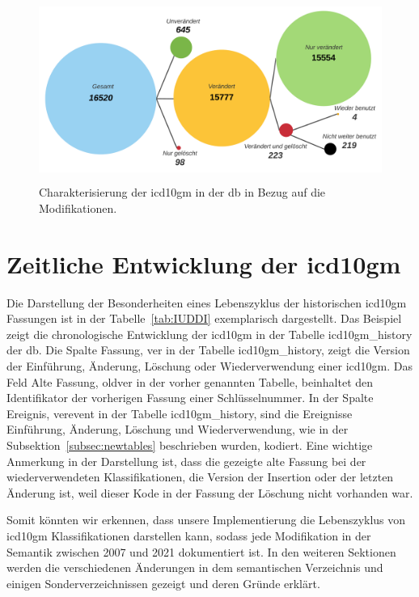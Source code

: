  \begin{figure}[ht]
 	\centering
 	\includegraphics[height=6cm]{figures/icd10gm_quantities}
 	\caption[\acs{icd10gm} in der \acs{db}]{Charakterisierung der \acs{icd10gm} in der \ac{db} in Bezug auf die Modifikationen.}
 	\label{fig:icddb}
 \end{figure}

\section{Zeitliche Entwicklung der \acs{icd10gm}} \label{sec:timeicd}

Die Darstellung der Besonderheiten eines Lebenszyklus der historischen \ac{icd10gm} Fassungen ist in der Tabelle~\ref{tab:IUDDI} exemplarisch dargestellt. Das Beispiel zeigt die chronologische Entwicklung der \ac{icd10gm} in der Tabelle \glqq\textsf{icd10gm\_history}\grqq{} der \ac{db}. Die Spalte Fassung, \glqq\textsf{ver}\grqq{} in der Tabelle \glqq\textsf{icd10gm\_history}\grqq{}, zeigt die Version der Einführung, Änderung, Löschung oder Wiederverwendung einer \ac{icd10gm}. Das Feld Alte Fassung, \glqq\textsf{oldver}\grqq{} in der vorher genannten Tabelle, beinhaltet den Identifikator der vorherigen Fassung einer Schlüsselnummer. In der Spalte Ereignis, \glqq\textsf{verevent}\grqq{} in der Tabelle \glqq\textsf{icd10gm\_history}\grqq{}, sind die Ereignisse Einführung, Änderung, Löschung und Wiederverwendung, wie in der Subsektion~\ref{subsec:newtables} beschrieben wurden, kodiert. Eine wichtige Anmerkung in der Darstellung ist, dass die gezeigte alte Fassung bei der wiederverwendeten Klassifikationen, die Version der Insertion oder der letzten Änderung ist, weil dieser Kode in der Fassung der Löschung nicht vorhanden war.

Somit könnten wir erkennen, dass unsere Implementierung die Lebenszyklus von \ac{icd10gm} Klassifikationen darstellen kann, sodass jede Modifikation in der Semantik zwischen 2007 und 2021 dokumentiert ist. In den weiteren Sektionen werden die verschiedenen Änderungen in dem semantischen Verzeichnis und einigen Sonderverzeichnissen gezeigt und deren Gründe erklärt.

